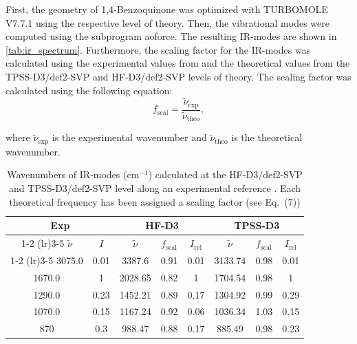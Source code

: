 \documentclass[fontsize=11pt,a4paper,oneside]{scrartcl}
\begin{document}
First, the geometry of 1,4-Benzoquinone was optimized with TURBOMOLE V7.7.1\autocite{Turbomole2007} using the respective level of theory. Then, the vibrational modes were computed using the subprogram aoforce. The resulting IR-modes are shown in \autoref{tab:ir_spectrum}. Furthermore, the scaling factor for the IR-modes was calculated using the experimental values from \cite{AKGrimme2025} and the theoretical values from the \ac{TPSS}-D3/def2-SVP and \ac{HF}-D3/def2-SVP levels of theory. The scaling factor was calculated using the following equation:
\begin{equation}
    f_{\text{scal}} = \frac{\tilde{\nu}_{\text{exp}}}{\tilde{\nu}_{\text{theo}}},
    \label{eq:scaling_factor}
\end{equation}

where $\tilde{\nu}_{\text{exp}}$ is the experimental wavenumber and $\tilde{\nu}_{\text{theo}}$ is the theoretical wavenumber. 

\begin{table}[htbp]
    \centering
    \caption{Wavenumbers of IR-modes (cm$^{-1}$) calculated at the \ac{HF}-D3/def2-SVP and \ac{TPSS}-D3/def2-SVP level along an experimental reference \cite{AKGrimme2025}. Each theoretical frequency has been assigned a scaling factor (see Eq.~(7))}
        \begin{tabular}{@{}cccccccc@{}} \toprule
        \multicolumn{2}{c}{Exp\autocite{AKGrimme2025}} & \multicolumn{3}{c}{\ac{HF}-D3} & \multicolumn{3}{c}{\ac{TPSS}-D3} \\
        \cmidrule{1-2} \cmidrule(lr){3-5} \cmidrule{6-8}
        $\tilde{\nu}$ & $I$ & $\tilde{\nu}$ & $f_{\text{scal}}$ & $I_{\text{rel}}$ & $\tilde{\nu}$ & $f_{\text{scal}}$ & $I_{\text{rel}}$ \\
        \cmidrule{1-2} \cmidrule(lr){3-5} \cmidrule{6-8}
        3075.0 & 0.01 & 3387.6 & 0.91 & 0.01 & 3133.74 & 0.98 & 0.01 \\
        1670.0 & 1 & 2028.65 & 0.82 & 1 & 1704.54 & 0.98 & 1 \\
        1290.0 & 0.23 & 1452.21 & 0.89 & 0.17 & 1304.92 & 0.99 & 0.29 \\
        1070.0 & 0.15 & 1167.24 & 0.92 & 0.06 & 1036.34 & 1.03 & 0.15 \\
        870 & 0.3 & 988.47 & 0.88 & 0.17 & 885.49 & 0.98 & 0.23 \\ \bottomrule
        \end{tabular}
    \label{tab:ir_spectrum}
\end{table}
\end{document}
